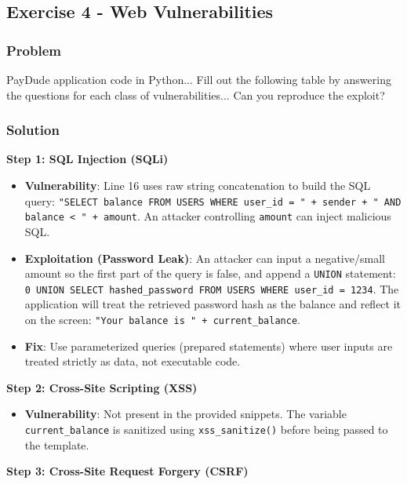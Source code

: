 \documentclass{article}
\begin{document}
\subsection{Exercise 4 - Web Vulnerabilities}
\subsubsection*{Problem}
PayDude application code in Python... Fill out the following table by answering the questions for each class of vulnerabilities... Can you reproduce the exploit?

\subsubsection*{Solution}
\textbf{Step 1: SQL Injection (SQLi)}
\begin{itemize}
    \item \textbf{Vulnerability}: Line 16 uses raw string concatenation to build the SQL query: \texttt{"SELECT balance FROM USERS WHERE user\_id = " + sender + " AND balance < " + amount}. An attacker controlling \texttt{amount} can inject malicious SQL.
    \item \textbf{Exploitation (Password Leak)}: An attacker can input a negative/small amount so the first part of the query is false, and append a \texttt{UNION} statement: \texttt{0 UNION SELECT hashed\_password FROM USERS WHERE user\_id = 1234}. The application will treat the retrieved password hash as the balance and reflect it on the screen: \texttt{"Your balance is " + current\_balance}.
    \item \textbf{Fix}: Use parameterized queries (prepared statements) where user inputs are treated strictly as data, not executable code.

\end{itemize}
\textbf{Step 2: Cross-Site Scripting (XSS)}
\begin{itemize}
    \item \textbf{Vulnerability}: Not present in the provided snippets. The variable \texttt{current\_balance} is sanitized using \texttt{xss\_sanitize()} before being passed to the template.

\end{itemize}
\textbf{Step 3: Cross-Site Request Forgery (CSRF)}
\end{document}
